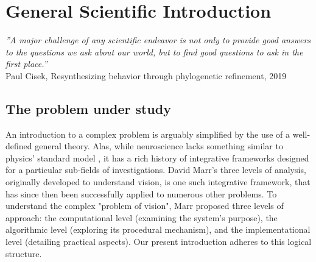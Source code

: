 \chapter{General Scientific Introduction}

\begin{flushright}
    \textit{''A major challenge of any scientific endeavor is not only to provide good answers to the questions we ask about our world, but to find good questions to ask in the first place.''}\\
    Paul Cisek, Resynthesizing behavior through phylogenetic refinement, 2019
\end{flushright}

\chaptertoc{}


 
\section{The problem under study}
An introduction to a complex problem is arguably simplified by the use of a well-defined general theory. Alas, while neuroscience lacks something similar to physics' standard model \cite{cottingham2023introduction}, it has a rich history of integrative frameworks designed for a particular sub-fields of investigations. David Marr's three levels of analysis, originally developed to understand vision\cite{marr1982vision}, is one such integrative framework, that has since then been successfully applied to numerous other problems\cite{mcclamrock1991marr,peebles2015thirty}. To understand the complex "problem of vision", Marr proposed three levels of approach: the computational level (examining the system's purpose), the algorithmic level (exploring its procedural mechanism), and the implementational level (detailing practical aspects). Our present introduction adheres to this logical structure.

